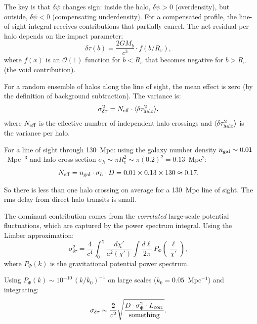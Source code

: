 \documentclass[11pt]{article}
\begin{document}
The key is that $\delta\psi$ changes sign: inside the halo,
$\delta\psi > 0$ (overdensity), but outside, $\delta\psi < 0$
(compensating underdensity). For a compensated profile, the
line-of-sight integral receives contributions that partially
cancel. The net residual per halo depends on the impact parameter:
\begin{equation}
\delta\tau(b) = \frac{2GM_b}{c^3}\cdot f(b/R_v),
\end{equation}
where $f(x)$ is an $\mathcal{O}(1)$ function for $b < R_v$ that
becomes negative for $b > R_v$ (the void contribution).

For a random ensemble of halos along the line of sight, the mean
effect is zero (by the definition of background subtraction). The
variance is:
\begin{equation}
\sigma_{\delta\tau}^2 = N_{\rm eff}\cdot\langle\delta\tau_{\rm halo}^2\rangle,
\end{equation}
where $N_{\rm eff}$ is the effective number of independent halo
crossings and $\langle\delta\tau_{\rm halo}^2\rangle$ is the
variance per halo.

For a line of sight through 130~Mpc: using the galaxy number density
$n_{\rm gal} \sim 0.01$~Mpc$^{-3}$ and halo cross-section
$\sigma_h \sim \pi R_v^2 \sim \pi(0.2)^2 = 0.13$~Mpc$^2$:
\begin{equation}
N_{\rm eff} = n_{\rm gal}\cdot\sigma_h\cdot D
= 0.01\times 0.13\times 130 \approx 0.17.
\end{equation}

So there is less than one halo crossing on average for a 130~Mpc
line of sight. The rms delay from direct halo transits is small.

The dominant contribution comes from the \emph{correlated} large-scale
potential fluctuations, which are captured by the power spectrum
integral. Using the Limber approximation:
\begin{equation}
\sigma_{\delta\tau}^2 = \frac{4}{c^4}\int_0^\chi
\frac{d\chi'}{a^2(\chi')}\int \frac{d\ell}{2\pi}\,
P_\Phi\!\left(\frac{\ell}{\chi'}\right),
\end{equation}
where $P_\Phi(k)$ is the gravitational potential power spectrum.

Using $P_\Phi(k) \sim 10^{-10}\,(k/k_0)^{-1}$ on large scales
($k_0 = 0.05$~Mpc$^{-1}$) and integrating:
\begin{equation}
\sigma_{\delta\tau} \sim \frac{2}{c^2}\sqrt{\frac{D\cdot
\sigma_\Phi^2 \cdot L_{\rm corr}}{\text{something}}}.
\end{equation}
\end{document}
